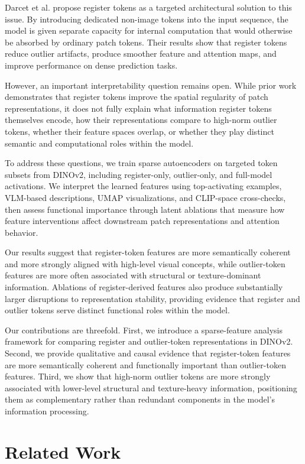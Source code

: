 \documentclass{article}
\theoremstyle{plain}
\theoremstyle{definition}
\theoremstyle{remark}
\begin{document}
Darcet et al. propose register tokens as a targeted architectural solution to this issue. By introducing dedicated non-image tokens into the input sequence, the model is given separate capacity for internal computation that would otherwise be absorbed by ordinary patch tokens. Their results show that register tokens reduce outlier artifacts, produce smoother feature and attention maps, and improve performance on dense prediction tasks.

However, an important interpretability question remains open. While prior work demonstrates that register tokens improve the spatial regularity of patch representations, it does not fully explain what information register tokens themselves encode, how their representations compare to high-norm outlier tokens, whether their feature spaces overlap, or whether they play distinct semantic and computational roles within the model.

To address these questions, we train sparse autoencoders on targeted token subsets from DINOv2, including register-only, outlier-only, and full-model activations. We interpret the learned features using top-activating examples, VLM-based descriptions, UMAP visualizations, and CLIP-space cross-checks, then assess functional importance through latent ablations that measure how feature interventions affect downstream patch representations and attention behavior.

Our results suggest that register-token features are more semantically coherent and more strongly aligned with high-level visual concepts, while outlier-token features are more often associated with structural or texture-dominant information. Ablations of register-derived features also produce substantially larger disruptions to representation stability, providing evidence that register and outlier tokens serve distinct functional roles within the model.

Our contributions are threefold. First, we introduce a sparse-feature analysis framework for comparing register and outlier-token representations in DINOv2. Second, we provide qualitative and causal evidence that register-token features are more semantically coherent and functionally important than outlier-token features. Third, we show that high-norm outlier tokens are more strongly associated with lower-level structural and texture-heavy information, positioning them as complementary rather than redundant components in the model’s information processing.

\section{Related Work}
\end{document}
